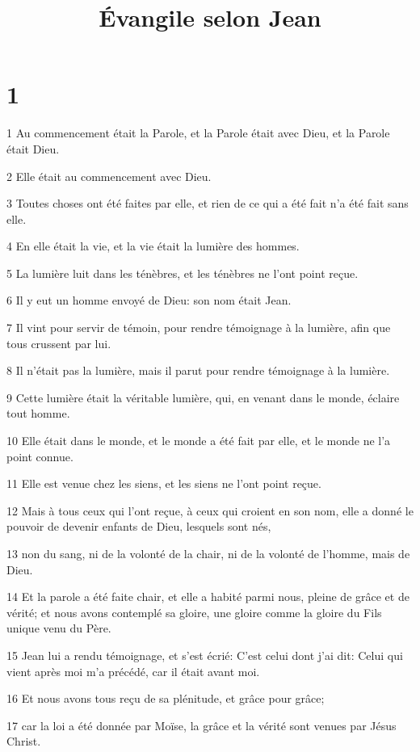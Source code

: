 

\title{Évangile selon Jean}


\chapter{1}

\par 1 Au commencement était la Parole, et la Parole était avec Dieu, et la Parole était Dieu.
\par 2 Elle était au commencement avec Dieu.
\par 3 Toutes choses ont été faites par elle, et rien de ce qui a été fait n'a été fait sans elle.
\par 4 En elle était la vie, et la vie était la lumière des hommes.
\par 5 La lumière luit dans les ténèbres, et les ténèbres ne l'ont point reçue.
\par 6 Il y eut un homme envoyé de Dieu: son nom était Jean.
\par 7 Il vint pour servir de témoin, pour rendre témoignage à la lumière, afin que tous crussent par lui.
\par 8 Il n'était pas la lumière, mais il parut pour rendre témoignage à la lumière.
\par 9 Cette lumière était la véritable lumière, qui, en venant dans le monde, éclaire tout homme.
\par 10 Elle était dans le monde, et le monde a été fait par elle, et le monde ne l'a point connue.
\par 11 Elle est venue chez les siens, et les siens ne l'ont point reçue.
\par 12 Mais à tous ceux qui l'ont reçue, à ceux qui croient en son nom, elle a donné le pouvoir de devenir enfants de Dieu, lesquels sont nés,
\par 13 non du sang, ni de la volonté de la chair, ni de la volonté de l'homme, mais de Dieu.
\par 14 Et la parole a été faite chair, et elle a habité parmi nous, pleine de grâce et de vérité; et nous avons contemplé sa gloire, une gloire comme la gloire du Fils unique venu du Père.
\par 15 Jean lui a rendu témoignage, et s'est écrié: C'est celui dont j'ai dit: Celui qui vient après moi m'a précédé, car il était avant moi.
\par 16 Et nous avons tous reçu de sa plénitude, et grâce pour grâce;
\par 17 car la loi a été donnée par Moïse, la grâce et la vérité sont venues par Jésus Christ.
